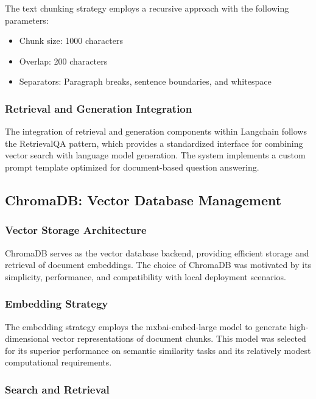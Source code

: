 \documentclass[12pt,letterpaper]{article}
\begin{document}
The text chunking strategy employs a recursive approach with the following parameters:
\begin{itemize}
    \item Chunk size: 1000 characters
    \item Overlap: 200 characters
    \item Separators: Paragraph breaks, sentence boundaries, and whitespace
\end{itemize}

\subsubsection{Retrieval and Generation Integration}

The integration of retrieval and generation components within Langchain follows the RetrievalQA pattern, which provides a standardized interface for combining vector search with language model generation. The system implements a custom prompt template optimized for document-based question answering.

\subsection{ChromaDB: Vector Database Management}

\subsubsection{Vector Storage Architecture}

ChromaDB serves as the vector database backend, providing efficient storage and retrieval of document embeddings. The choice of ChromaDB was motivated by its simplicity, performance, and compatibility with local deployment scenarios.

\subsubsection{Embedding Strategy}

The embedding strategy employs the mxbai-embed-large model to generate high-dimensional vector representations of document chunks. This model was selected for its superior performance on semantic similarity tasks and its relatively modest computational requirements.

\subsubsection{Search and Retrieval}
\end{document}
